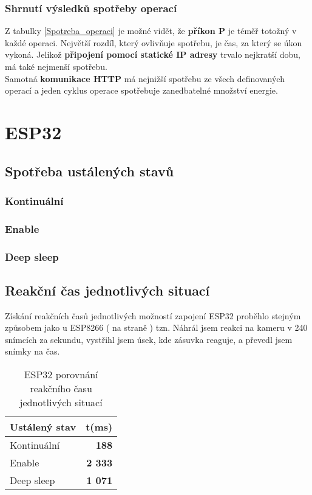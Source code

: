 \documentclass[a4paper, 12pt]{report}
\begin{document}
				\subsubsection{Shrnutí výsledků spotřeby operací}
					Z tabulky \ref{Spotreba_operaci} je možné vidět, že {\bf příkon P} je téměř totožný v každé operaci. Největší rozdíl, který ovlivňuje spotřebu, je čas, za který se úkon vykoná. Jelikož {\bf připojení pomocí statické IP adresy} trvalo nejkratší dobu, má také nejmenší spotřebu.\\
					Samotná {\bf komunikace HTTP} má nejnižší spotřebu ze všech definovaných operací a jeden cyklus operace spotřebuje zanedbatelné množství energie.


		\section{ESP32}

			\subsection{Spotřeba ustálených stavů}

				\subsubsection{Kontinuální}

				\subsubsection{Enable}

				\subsubsection{Deep sleep}

			\subsection{Reakční čas jednotlivých situací}
				Získání reakčních časů jednotlivých možností zapojení ESP32 proběhlo stejným způsobem jako u ESP8266 ( na straně \pageref{sonyvegaspostup}) tzn. Náhrál jsem reakci na kameru v 240 snímcích za sekundu, vystřihl jsem úsek, kde zásuvka reaguje, a převedl jsem snímky na čas.

				\begin{table}[h]
					\centering
					\caption{ESP32 porovnání reakčního času jednotlivých situací}
					\begin{tabular}{||l|r||}
						\hline
						Ustálený stav & t(ms) \\
						\hline
						Kontinuální & {\bf 188} \\
						Enable & {\bf 2 333} \\
						Deep sleep & {\bf 1 071} \\
						\hline
					\end{tabular}
					\label{ESP32 klidové režimy čas}
				\end{table}
\end{document}
